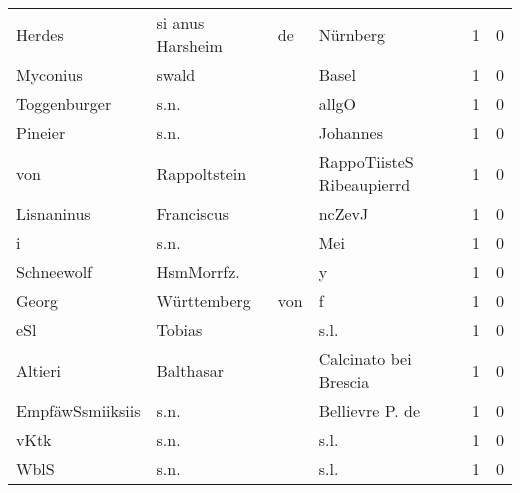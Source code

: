 \begin{center}
\begin{tiny}
\begin{longtabu}{llllrr}
                   Herdes &                   si anus Harsheim &          de &                                    Nürnberg &          1 &         0 \\
                 Myconius &                              swald &             &                                       Basel &          1 &         0 \\
             Toggenburger &                               s.n. &             &                                       allgO &          1 &         0 \\
                  Pineier &                               s.n. &             &                                    Johannes &          1 &         0 \\
                      von &                       Rappoltstein &             &                   RappoTiisteS Ribeaupierrd &          1 &         0 \\
               Lisnaninus &                         Franciscus &             &                                      ncZevJ &          1 &         0 \\
                        i &                               s.n. &             &                                         Mei &          1 &         0 \\
               Schneewolf &                         HsmMorrfz. &             &                                           y &          1 &         0 \\
                    Georg &                        Württemberg &         von &                                           f &          1 &         0 \\
                      eSl &                             Tobias &             &                                        s.l. &          1 &         0 \\
                  Altieri &                          Balthasar &             &                       Calcinato bei Brescia &          1 &         0 \\
         EmpfäwSsmiiksiis &                               s.n. &             &                             Bellievre P. de &          1 &         0 \\
                     vKtk &                               s.n. &             &                                        s.l. &          1 &         0 \\
                     WblS &                               s.n. &             &                                        s.l. &          1 &         0 \\

\end{longtabu}
\end{tiny}
\end{center}
